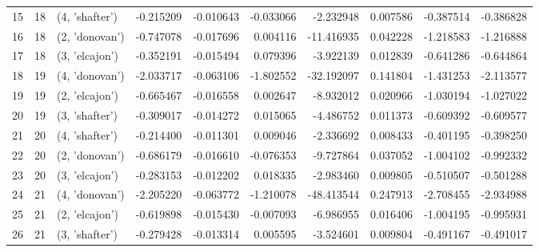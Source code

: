 \begin{tabular}{lrlrrrrrrr}
15 &     18 &  (4, 'shafter') & -0.215209 & -0.010643 & -0.033066 &  -2.232948 &  0.007586 & -0.387514 & -0.386828 \\
16 &     18 &  (2, 'donovan') & -0.747078 & -0.017696 &  0.004116 & -11.416935 &  0.042228 & -1.218583 & -1.216888 \\
17 &     18 &  (3, 'elcajon') & -0.352191 & -0.015494 &  0.079396 &  -3.922139 &  0.012839 & -0.641286 & -0.644864 \\
18 &     19 &  (4, 'donovan') & -2.033717 & -0.063106 & -1.802552 & -32.192097 &  0.141804 & -1.431253 & -2.113577 \\
19 &     19 &  (2, 'elcajon') & -0.665467 & -0.016558 &  0.002647 &  -8.932012 &  0.020966 & -1.030194 & -1.027022 \\
20 &     19 &  (3, 'shafter') & -0.309017 & -0.014272 &  0.015065 &  -4.486752 &  0.011373 & -0.609392 & -0.609577 \\
21 &     20 &  (4, 'shafter') & -0.214400 & -0.011301 &  0.009046 &  -2.336692 &  0.008433 & -0.401195 & -0.398250 \\
22 &     20 &  (2, 'donovan') & -0.686179 & -0.016610 & -0.076353 &  -9.727864 &  0.037052 & -1.004102 & -0.992332 \\
23 &     20 &  (3, 'elcajon') & -0.283153 & -0.012202 &  0.018335 &  -2.983460 &  0.009805 & -0.510507 & -0.501288 \\
24 &     21 &  (4, 'donovan') & -2.205220 & -0.063772 & -1.210078 & -48.413544 &  0.247913 & -2.708455 & -2.934988 \\
25 &     21 &  (2, 'elcajon') & -0.619898 & -0.015430 & -0.007093 &  -6.986955 &  0.016406 & -1.004195 & -0.995931 \\
26 &     21 &  (3, 'shafter') & -0.279428 & -0.013314 &  0.005595 &  -3.524601 &  0.009804 & -0.491167 & -0.491017 \\
\bottomrule
\end{tabular}
